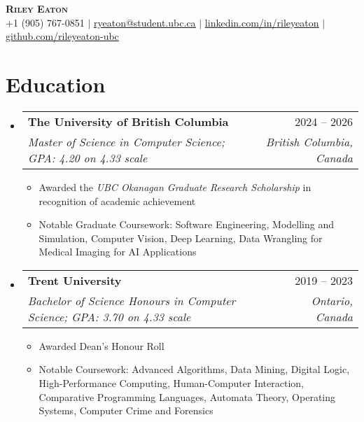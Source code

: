 \documentclass[letterpaper,11.5pt]{article}
\makeatletter
\newcommand{\resumeItem}[1]{
  \item\small{
    {#1 \vspace{-2pt}}
  }
}
\newcommand{\resumeSubheading}[4]{
  \vspace{-2pt}\item
    \begin{tabular*}{0.97\textwidth}[t]{l@{\extracolsep{\fill}}r}
      \textbf{#1} & #2 \\
      \textit{\small#3} & \textit{\small #4} \\
    \end{tabular*}\vspace{-7pt}
}
\newcommand{\resumeSubHeadingListStart}{\begin{itemize}[leftmargin=0.15in, label={}]}
\newcommand{\resumeSubHeadingListEnd}{\end{itemize}}
\newcommand{\resumeItemListStart}{\begin{itemize}}
\newcommand{\resumeItemListEnd}{\end{itemize}\vspace{-5pt}}
\def\iconSpace{0.5pt}
\makeatother
\begin{document}
\begin{center}
    \textbf{\Huge \scshape Riley Eaton} \\ \vspace{1pt}
    \small \faMobile \hspace{\iconSpace} +1 (905) 767-0851 
    $|$ \faEnvelope \hspace{\iconSpace} \href{mailto:ryeaton@student.ubc.ca}{\underline{ryeaton@student.ubc.ca}} 
    $|$ \faLinkedinSquare \hspace{\iconSpace} \href{https://linkedin.com/in/rileyeaton}{\underline{linkedin.com/in/rileyeaton}} 
    $|$ \faGithub \hspace{\iconSpace} \href{https://github.com/rileyeaton-ubc}{\underline{github.com/rileyeaton-ubc}}
\end{center}

\section{Education}
  \resumeSubHeadingListStart
    \resumeSubheading
      {The University of British Columbia}{2024 -- 2026}
      {Master of Science in Computer Science; GPA: 4.20 on 4.33 scale}{British Columbia, Canada}
      \resumeItemListStart
        \resumeItem{Awarded the \emph{UBC Okanagan Graduate Research Scholarship} in recognition of academic achievement}
        \resumeItem{Notable Graduate Coursework: Software Engineering, Modelling and Simulation, Computer Vision, Deep Learning, Data Wrangling for Medical Imaging for AI Applications}
      \resumeItemListEnd
    \resumeSubheading
      {Trent University}{2019 -- 2023}
      {Bachelor of Science Honours in Computer Science; GPA: 3.70 on 4.33 scale}{Ontario, Canada}
      \resumeItemListStart
        \resumeItem{Awarded Dean's Honour Roll}
        \resumeItem{Notable Coursework: Advanced Algorithms, Data Mining, Digital Logic, High-Performance Computing, Human-Computer Interaction, Comparative Programming Languages, Automata Theory, Operating Systems, Computer Crime and Forensics}
      \resumeItemListEnd
  \resumeSubHeadingListEnd

\end{document}
